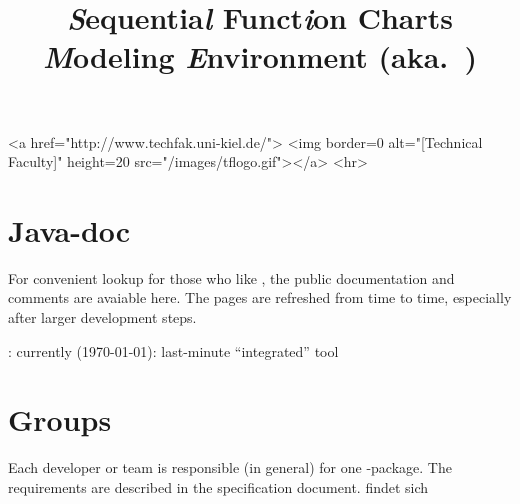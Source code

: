 \documentclass[11pt,german]{article}
\title{{\huge\bf \textsl{S}equentia\textsl{l} Funct\textsl{i}on Charts
    \textsl{M}odeling \textsl{E}nvironment (aka.\ \Slime)}}
\date{}
\begin{document}
\vspace{-2cm}



\begin{rawhtml}
<a href="http://www.techfak.uni-kiel.de/">
  <img border=0 alt="[Technical Faculty]" height=20  src="/images/tflogo.gif"></a>
<hr>
\end{rawhtml}


\maketitle{}










\section*{Java-doc}
\label{sec:javadoc}
\label{sec:html-doc}



For convenient lookup for those who like \javadoc, the public documentation
and comments are avaiable here. The pages are refreshed from time to time,
especially after larger development steps.

\begin{center}
  : currently (\today): last-minute
  ``integrated'' tool
\end{center}

















\section*{Groups}
\label{sec:groups}

Each developer or team is responsible (in general) for one \Java-package.
The requirements are described in the specification document.  findet sich
\end{document}

